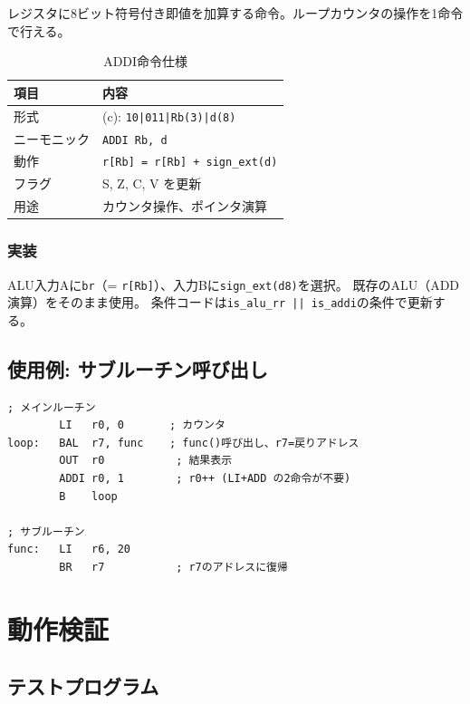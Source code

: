 \documentclass[a4paper,11pt]{ltjsarticle}
\begin{document}
レジスタに8ビット符号付き即値を加算する命令。ループカウンタの操作を1命令で行える。

\begin{table}[h]
\centering
\caption{ADDI命令仕様}
\begin{tabular}{ll}
\toprule
項目 & 内容 \\
\midrule
形式       & (c): \texttt{10|011|Rb(3)|d(8)} \\
ニーモニック & \texttt{ADDI Rb, d} \\
動作       & \texttt{r[Rb] = r[Rb] + sign\_ext(d)} \\
フラグ     & S, Z, C, V を更新 \\
用途       & カウンタ操作、ポインタ演算 \\
\bottomrule
\end{tabular}
\end{table}

\subsubsection{実装}

ALU入力Aに\texttt{br}（= \texttt{r[Rb]}）、入力Bに\texttt{sign\_ext(d8)}を選択。
既存のALU（ADD演算）をそのまま使用。
条件コードは\texttt{is\_alu\_rr || is\_addi}の条件で更新する。

\subsection{使用例: サブルーチン呼び出し}

\begin{lstlisting}[language={},caption={BAL/BR/ADDIの使用例}]
; メインルーチン
        LI   r0, 0       ; カウンタ
loop:   BAL  r7, func    ; func()呼び出し、r7=戻りアドレス
        OUT  r0           ; 結果表示
        ADDI r0, 1        ; r0++ (LI+ADD の2命令が不要)
        B    loop

; サブルーチン
func:   LI   r6, 20
        BR   r7           ; r7のアドレスに復帰
\end{lstlisting}


\section{動作検証}

\subsection{テストプログラム}
\end{document}
